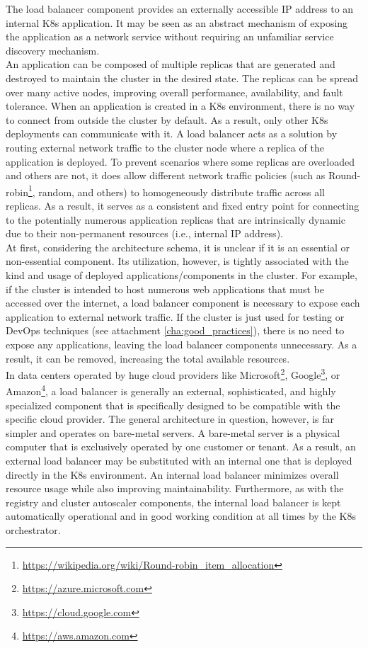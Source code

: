 The load balancer component provides an externally accessible IP address to an
internal K8s application. It may be seen as an abstract mechanism of exposing the
application as a network service without requiring an unfamiliar service discovery
mechanism\cite{load_balancer}. \\ %
An application can be composed of multiple replicas that are generated and
destroyed to maintain the cluster in the desired state. The replicas can be spread
over many active nodes, improving overall performance, availability, and fault
tolerance. When an application is created in a K8s environment, there is no way
to connect from outside the cluster by default. As a result, only other K8s
deployments can communicate with it. A load balancer acts as a solution by routing
external network traffic to the cluster node where a replica of the application is
deployed. To prevent scenarios where some replicas are overloaded and others are
not, it does allow different network traffic policies (such as Round-robin\footnote{\url{https://wikipedia.org/wiki/Round-robin_item_allocation}},
random, and others) to homogeneously distribute traffic across all replicas. As
a result, it serves as a consistent and fixed entry point for connecting to the potentially
numerous application replicas that are intrinsically dynamic due to their non-permanent
resources (i.e., internal IP address). \\ %
At first, considering the architecture schema, it is unclear if it is an essential
or non-essential component. Its utilization, however, is tightly associated with
the kind and usage of deployed applications/components in the cluster. For example,
if the cluster is intended to host numerous web applications that must be
accessed over the internet, a load balancer component is necessary to expose each
application to external network traffic. If the cluster is just used for testing
or DevOps techniques (see attachment \ref{cha:good_practices}), there is no need
to expose any applications, leaving the load balancer components unnecessary. As
a result, it can be removed, increasing the total available resources. \\ %
In data centers operated by huge cloud providers like Microsoft\footnote{\url{https://azure.microsoft.com}},
Google\footnote{\url{https://cloud.google.com}}, or Amazon\footnote{\url{https://aws.amazon.com}},
a load balancer is generally an external, sophisticated, and highly specialized
component that is specifically designed to be compatible with the specific cloud
provider. The general architecture in question, however, is far simpler and operates
on bare-metal servers. A bare-metal server is a physical computer that is
exclusively operated by one customer or tenant\cite{bare_metal_server}. As a
result, an external load balancer may be substituted with an internal one that is
deployed directly in the K8s environment. An internal load balancer minimizes
overall resource usage while also improving maintainability. Furthermore, as
with the registry and cluster autoscaler components, the internal load balancer is
kept automatically operational and in good working condition at all times by the
K8s orchestrator.

